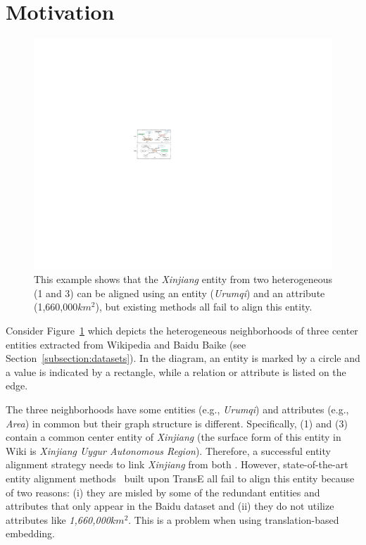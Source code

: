 \section{Motivation\label{sec:motivation}}
\begin{figure}[t!]
		\centering
			\includegraphics[width=0.9\linewidth]{figures/graph1.pdf}
			\caption{This example shows that the \emph{Xinjiang} entity from two heterogeneous \KGs (1 and 3) can be aligned using an entity (\emph{Urumqi}) and an attribute (1,660,000$km^2$), but existing methods all fail to align this entity.}
			\label{Xinjiang}
	\end{figure}
Consider Figure~\ref{Xinjiang} which depicts the heterogeneous neighborhoods of three center entities extracted from Wikipedia and Baidu
Baike (see Section~\ref{subsection:datasets}). In the diagram, an entity is marked by a circle and a value is indicated by a rectangle,
while a relation or attribute is listed on the edge.


The three neighborhoods have some entities (e.g., \emph{Urumqi}) and attributes (e.g., \emph{Area}) in common but their graph structure is
different. Specifically, \KGs (1) and (3) contain a common center entity of \emph{Xinjiang} (the surface form of this entity in Wiki is
\emph{Xinjiang Uygur Autonomous Region}). Therefore, a successful entity alignment strategy needs to link \emph{Xinjiang} from both \KGs.
However, state-of-the-art entity alignment methods~\cite{hao2016joint,chen2016multilingual,sun2017cross,zhu2017iterative} built upon TransE
all fail to align this entity because of two reasons: (i) they are misled by some of the redundant entities and attributes that only appear
in the Baidu dataset and (ii) they do not utilize attributes like \emph{1,660,000$km^2$}. This is a problem when using translation-based
embedding.

